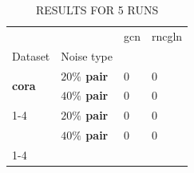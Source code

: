 \begin{table}
\caption{RESULTS FOR 5 RUNS}
\begin{tabular}{llll}
\toprule
 &  & gcn & rncgln \\
Dataset & Noise type &  &  \\
\midrule
\multirow[t]{2}{*}{\textbf{cora}} & \textbf{$ 20 \% $ pair} & 0 & 0 \\
\textbf{} & \textbf{$ 40 \% $ pair} & 0 & 0 \\
\cline{1-4}
\multirow[t]{2}{*}{\textbf{citeseer}} & \textbf{$ 20 \% $ pair} & 0 & 0 \\
\textbf{} & \textbf{$ 40 \% $ pair} & 0 & 0 \\
\cline{1-4}
\bottomrule
\end{tabular}
\end{table}
